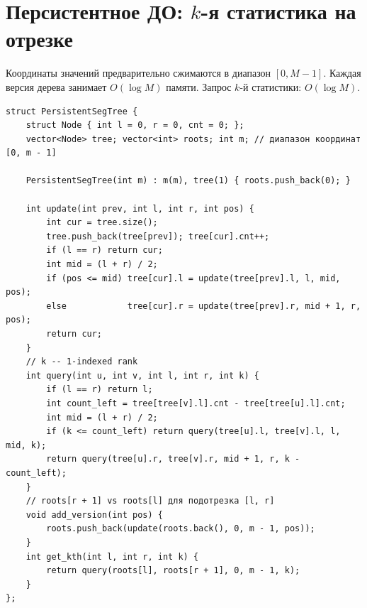 \section{Персистентное ДО: $k$-я статистика на отрезке}
Координаты значений предварительно сжимаются в диапазон $[0, M - 1]$.
Каждая версия дерева занимает $O(\log M)$ памяти. Запрос $k$-й статистики: $O(\log M)$.
\begin{lstlisting}[name=persistent_segtree]
struct PersistentSegTree {
    struct Node { int l = 0, r = 0, cnt = 0; };
    vector<Node> tree; vector<int> roots; int m; // диапазон координат [0, m - 1]

    PersistentSegTree(int m) : m(m), tree(1) { roots.push_back(0); }

    int update(int prev, int l, int r, int pos) {
        int cur = tree.size();
        tree.push_back(tree[prev]); tree[cur].cnt++;
        if (l == r) return cur;
        int mid = (l + r) / 2;
        if (pos <= mid) tree[cur].l = update(tree[prev].l, l, mid, pos);
        else            tree[cur].r = update(tree[prev].r, mid + 1, r, pos);
        return cur;
    }
    // k -- 1-indexed rank
    int query(int u, int v, int l, int r, int k) {
        if (l == r) return l;
        int count_left = tree[tree[v].l].cnt - tree[tree[u].l].cnt;
        int mid = (l + r) / 2;
        if (k <= count_left) return query(tree[u].l, tree[v].l, l, mid, k);
        return query(tree[u].r, tree[v].r, mid + 1, r, k - count_left);
    }
    // roots[r + 1] vs roots[l] для подотрезка [l, r]
    void add_version(int pos) {
        roots.push_back(update(roots.back(), 0, m - 1, pos));
    }
    int get_kth(int l, int r, int k) {
        return query(roots[l], roots[r + 1], 0, m - 1, k);
    }
};
\end{lstlisting}

